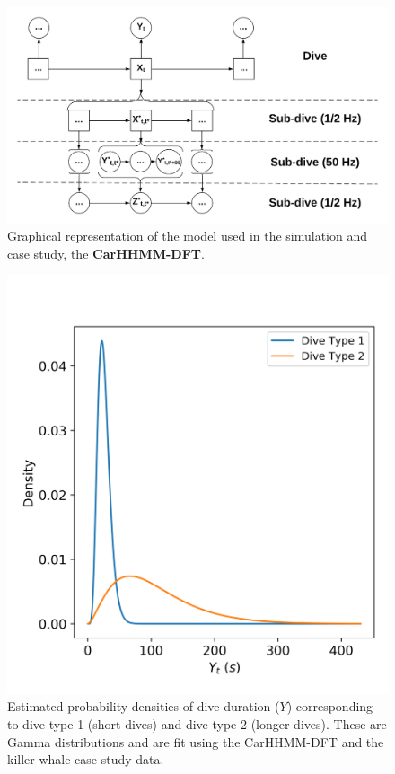 
\begin{figure}[ht]
	\centering
	\includegraphics[width=5in]{../Plots/CarHHMM-DFT.png}
	\caption{Graphical representation of the model used in the simulation and case study, the \textbf{CarHHMM-DFT}.}
	\label{fig:CarHHMM-DFT}
\end{figure}

\begin{figure}[ht]
	\centering
	\includegraphics[width=5in]{../Plots/CarHHMM2-coarse-emissions.png}
	\caption{Estimated probability densities of dive duration ($Y$) corresponding to dive type 1 (short dives) and dive type 2 (longer dives). These are Gamma distributions and are fit using the CarHHMM-DFT and the killer whale case study data.}
	\label{fig:coarse_emis}
\end{figure}

